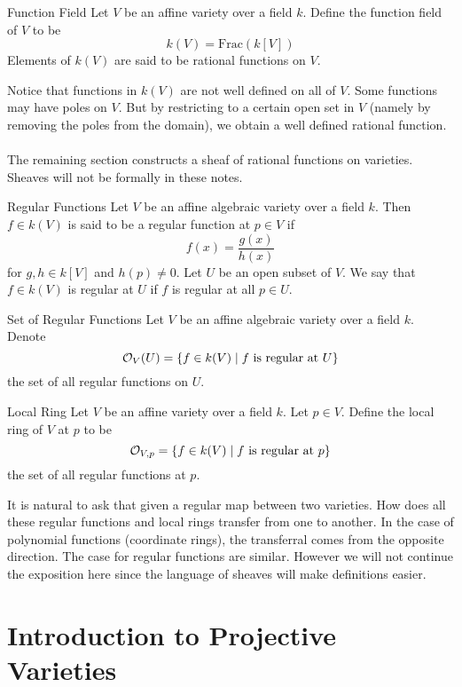 \documentclass[a4paper]{article}
\begin{document}
\begin{defn}{Function Field}{} Let $V$ be an affine variety over a field $k$. Define the function field of $V$ to be $$k(V)=\text{Frac}(k[V])$$ Elements of $k(V)$ are said to be rational functions on $V$. 
\end{defn}

Notice that functions in $k(V)$ are not well defined on all of $V$. Some functions may have poles on $V$. But by restricting to a certain open set in $V$ (namely by removing the poles from the domain), we obtain a well defined rational function. \\~\\

The remaining section constructs a sheaf of rational functions on varieties. Sheaves will not be formally in these notes. 

\begin{defn}{Regular Functions}{} Let $V$ be an affine algebraic variety over a field $k$. Then $f\in k(V)$ is said to be a regular function at $p\in V$ if $$f(x)=\frac{g(x)}{h(x)}$$ for $g,h\in k[V]$ and $h(p)\neq 0$. Let $U$ be an open subset of $V$. We say that $f\in k(V)$ is regular at $U$ if $f$ is regular at all $p\in U$. 
\end{defn}

\begin{defn}{Set of Regular Functions}{} Let $V$ be an affine algebraic variety over a field $k$. Denote $$\mathcal{O}_V(U)=\{f\in k(V)\;|\;f\text{ is regular at }U\}$$ the set of all regular functions on $U$. 
\end{defn}

\begin{defn}{Local Ring}{} Let $V$ be an affine variety over a field $k$. Let $p\in V$. Define the local ring of $V$ at $p$ to be $$\mathcal{O}_{V,p}=\{f\in k(V)\;|\;f\text{ is regular at }p\}$$ the set of all regular functions at $p$. 
\end{defn}

It is natural to ask that given a regular map between two varieties. How does all these regular functions and local rings transfer from one to another. In the case of polynomial functions (coordinate rings), the transferral comes from the opposite direction. The case for regular functions are similar. However we will not continue the exposition here since the language of sheaves will make definitions easier. 

\pagebreak
\section{Introduction to Projective Varieties}
\end{document}
